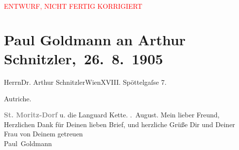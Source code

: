 
\begin{center}
            \textcolor{red}{ENTWURF, NICHT FERTIG KORRIGIERT}
                      \end{center}
            
         
         \renewcommand{\erwaehntePersonen}{Personen: Olga Schnitzler}
         \renewcommand{\erwaehnteOrte}{Orte: Edmund-Weiß-Gasse, Piz Languard, Sankt Moritz, Wien, Österreich-Ungarn}
         \renewcommand{\erwaehnteWerke}{}
               \section[ Paul Goldmann an Arthur Schnitzler, 26. 8. 1905]{ Paul Goldmann an Arthur Schnitzler, 26. 8. 1905}\nopagebreak{}\rehead{ }\begin{ledgroupsized}[t]{13cm}\normalsize\beginnumbering \toendnotes[C]{\smallbreak\pagebreak[2]} 
\toendnotes[C]{\smallbreak}\pstart{}{\pb}Herrn\pend{}\pstart{}Dr. Arthur Schnitzler\pend{}\pstart{}Wien\pend{}\pstart{}XVIII. Spöttelgaſse 7.\pend{}\pstart{}\begin{otherlanguage}{french}Autriche.\end{otherlanguage}\pend{}{\bigskip}\pstart
           \noindent{}\textcolor{gray}{\textbf{{\pb}\textbf{St. Moritz-Dorf}}} u. die Languard Kette.\pend
           . August.\pend
           \pstart{}Mein lieber Freund,\pend\pstart
           Herzlichen Dank für Deinen lieben Brief, und herzliche Grüße Dir und Deiner Frau von Deinem getreuen {\\}\spacefill\mbox{Paul Goldmann}\pend
           
         
         \endnumbering{}\end{ledgroupsized}  \newcommand{\dateiname}{L03235}\newcommand{\titel}{Paul Goldmann an Arthur Schnitzler, 26. 8. 1905}\newcommand{\editorInnen}{Martin Anton Müller und Laura Untner}
      